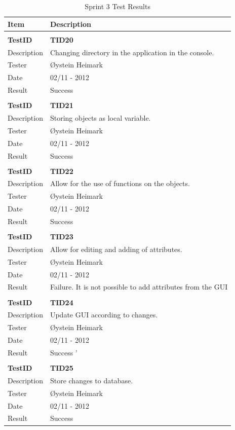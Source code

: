 \begin{table}
\caption{Sprint 3 Test Results}
\centering
\begin{tabular}{ l p{13cm} }

\hline 
Item			&Description		\\
\hline \\ [-2.0ex]

\bf{TestID}		&\bf{TID20}			\\
Description	&Changing directory in the application in the console.	\\
Tester		&Øystein Heimark	\\
Date			&02/11 - 2012	\\
Result		&Success				\\
\hline \\ [-2.0ex]

\bf{TestID}		&\bf{TID21}			\\
Description	&Storing objects as local variable.  	\\
Tester		&Øystein Heimark	\\
Date			&02/11 - 2012	\\
Result		&Success			\\
\hline \\ [-2.0ex]

\bf{TestID}		&\bf{TID22}			\\
Description	&Allow for the use of functions on the objects.	\\
Tester		&Øystein Heimark	\\
Date			&02/11 - 2012	\\
Result		&Success			\\
\hline \\ [-2.0ex]

\bf{TestID}		&\bf{TID23}			\\
Description	&Allow for editing and adding of attributes.	\\
Tester		&Øystein Heimark	\\
Date			&02/11 - 2012	\\
Result		&Failure. It is not possible to add attributes from the GUI			\\
\hline \\ [-2.0ex]

\bf{TestID}		&\bf{TID24}			\\
Description	&Update GUI according to changes.	\\
Tester		&Øystein Heimark	\\
Date			&02/11 - 2012	\\
Result		&Success		'	\\
\hline \\ [-2.0ex]

\bf{TestID}		&\bf{TID25}			\\
Description	&Store changes to database.\\
Tester		&Øystein Heimark	\\
Date			&02/11 - 2012	\\
Result		&Success			\\
\hline

\end{tabular}
\label{table:sp3testresults}
\end{table}

